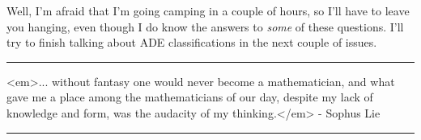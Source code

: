 Well, I'm afraid that I'm going camping in a couple of hours, so I'll
have to leave you hanging, even though I do know the answers to
\emph{some} of these questions.  I'll try to finish talking about
ADE classifications in the next couple of issues.


 \par\noindent\rule{\textwidth}{0.4pt}
<em>... without fantasy one would never become a mathematician,
and what gave me a place among the mathematicians of our day, despite
my lack of knowledge and form, was the audacity of my thinking.</em> - 
Sophus Lie
\par\noindent\rule{\textwidth}{0.4pt}

